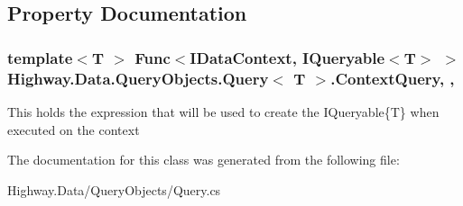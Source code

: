\subsection{Property Documentation}
\hypertarget{class_highway_1_1_data_1_1_query_objects_1_1_query-g_a68ecc8e5735dee1db60782614427cbbf}{
\subsubsection[{Context\-Query}]{\setlength{\rightskip}{0pt plus 5cm}template$<$T $>$ Func$<${\bf I\-Data\-Context}, I\-Queryable$<$T$>$ $>$ {\bf Highway.\-Data.\-Query\-Objects.\-Query}$<$ T $>$.Context\-Query\hspace{0.3cm}{\ttfamily [get]}, {\ttfamily [set]}, {\ttfamily [protected]}}}\label{class_highway_1_1_data_1_1_query_objects_1_1_query-g_a68ecc8e5735dee1db60782614427cbbf}


This holds the expression that will be used to create the I\-Queryable\{\-T\} when executed on the context 



The documentation for this class was generated from the following file\-:\begin{DoxyCompactItemize}
\item 
Highway.\-Data/\-Query\-Objects/Query.\-cs\end{DoxyCompactItemize}
